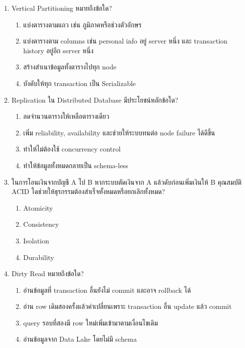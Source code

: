 \documentclass[a4paper,12pt]{article}
\begin{document}
\begin{enumerate}[label=\textbf{\arabic*.}]
    \item Vertical Partitioning หมายถึงข้อใด?
    \begin{enumerate}[label=\alph*.]
        \item แบ่งตารางตามแถว เช่น ภูมิภาคหรือช่วงตัวอักษร
        \item แบ่งตารางตาม columns เช่น personal info อยู่ server หนึ่ง และ transaction history อยู่อีก server หนึ่ง
        \item สร้างสำเนาข้อมูลทั้งตารางไปทุก node
        \item บังคับให้ทุก transaction เป็น Serializable
    \end{enumerate}

    \item Replication ใน Distributed Database มีประโยชน์หลักข้อใด?
    \begin{enumerate}[label=\alph*.]
        \item ลดจำนวนตารางให้เหลือตารางเดียว
        \item เพิ่ม reliability, availability และช่วยให้ระบบทนต่อ node failure ได้ดีขึ้น
        \item ทำให้ไม่ต้องใช้ concurrency control
        \item ทำให้ข้อมูลทั้งหมดกลายเป็น schema-less
    \end{enumerate}

    \item ในการโอนเงินจากบัญชี A ไป B หากระบบตัดเงินจาก A แล้วดับก่อนเพิ่มเงินให้ B คุณสมบัติ ACID ใดช่วยให้ธุรกรรมต้องสำเร็จทั้งหมดหรือยกเลิกทั้งหมด?
    \begin{enumerate}[label=\alph*.]
        \item Atomicity
        \item Consistency
        \item Isolation
        \item Durability
    \end{enumerate}

    \item Dirty Read หมายถึงข้อใด?
    \begin{enumerate}[label=\alph*.]
        \item อ่านข้อมูลที่ transaction อื่นยังไม่ commit และอาจ rollback ได้
        \item อ่าน row เดิมสองครั้งแล้วค่าเปลี่ยนเพราะ transaction อื่น update แล้ว commit
        \item query รอบที่สองมี row ใหม่เพิ่มเข้ามาตามเงื่อนไขเดิม
        \item อ่านข้อมูลจาก Data Lake โดยไม่มี schema
    \end{enumerate}


\end{enumerate}
\end{document}
